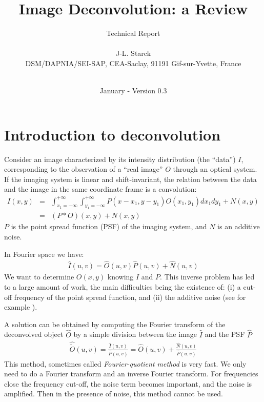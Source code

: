 \documentclass[11pt,a4paper]{article}
\title{{\Huge \bf  Image Deconvolution: a Review \\
              \underline{ \hspace{15cm}} }}
\author{ \huge {Technical Report} \\ 
       \vspace{2cm} \\
        J-L. Starck     \\  [12pt]
       DSM/DAPNIA/SEI-SAP, CEA-Saclay, 91191 Gif-sur-Yvette, France   \\
       \\ 
      \vspace{1cm}}
\date{January - Version 0.3\\
     \vspace{1cm}}
\begin{document}
\maketitle

\newpage
\tableofcontents

\newpage

\section{Introduction to deconvolution}

Consider an image characterized by its intensity
distribution (the ``data'') $I$, corresponding to the observation of a
``real image'' $O$ through an optical system. If the
imaging system is linear and shift-invariant, the relation between
the data and the image in the same coordinate frame is a
convolution:
\begin{eqnarray}
I(x,y) & = & \int_{x_1=-\infty}^{+\infty} 
             \int_{y_1=-\infty}^{+\infty}
             P(x-x_1, y-y_1) O(x_1,y_1)  dx_1 dy_1 + N(x,y) \\ 
& = & (P * O)(x,y) + N(x,y)
\label{eqn_3_first}
\end{eqnarray}
$P$ is the point spread function (PSF) of the imaging system, and $N$
is an additive noise. 

 
In Fourier space we have:
\begin{eqnarray}
\hat I(u,v)= \hat O(u,v) \hat P(u,v) + \hat N(u,v)
\end{eqnarray}
We want to determine $O(x,y)$ knowing $I$ and $P$. This
inverse problem has led to a large amount of work, the main difficulties 
being the existence of: (i) a cut-off frequency of the 
point spread function, 
and (ii) the additive noise 
(see for example \cite{rest:cornwell88,ima:katsa93,ima:bertero98,rest:molina01}).
 
A solution can be obtained by computing
  the Fourier transform of the deconvolved object $\hat{O}$ by
  a simple division between the image $\hat{I}$ and the PSF $\hat{P}$
\begin{eqnarray}
\hat{\tilde{O}}(u,v)=\frac{\hat{I}(u,v)}{\hat{P}(u,v)}=
   \hat{O}(u,v)+\frac{\hat{N}(u,v)}{\hat{P}(u,v)}
\end{eqnarray}
This  method, sometimes called {\em  Fourier-quotient method} is very fast. 
We only need to do a Fourier transform
 and an inverse Fourier transform. For frequencies close the frequency
 cut-off, the noise term becomes important, and the noise is amplified.
 Then in the presence of noise, this method cannot be used.
\end{document}
